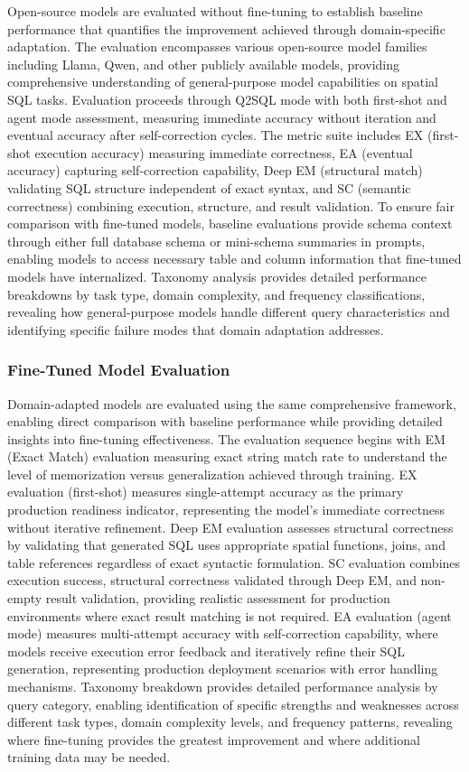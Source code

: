 Open-source models are evaluated without fine-tuning to establish baseline performance that quantifies the improvement achieved through domain-specific adaptation. The evaluation encompasses various open-source model families including Llama, Qwen, and other publicly available models, providing comprehensive understanding of general-purpose model capabilities on spatial SQL tasks. Evaluation proceeds through Q2SQL mode with both first-shot and agent mode assessment, measuring immediate accuracy without iteration and eventual accuracy after self-correction cycles. The metric suite includes EX (first-shot execution accuracy) measuring immediate correctness, EA (eventual accuracy) capturing self-correction capability, Deep EM (structural match) validating SQL structure independent of exact syntax, and SC (semantic correctness) combining execution, structure, and result validation. To ensure fair comparison with fine-tuned models, baseline evaluations provide schema context through either full database schema or mini-schema summaries in prompts, enabling models to access necessary table and column information that fine-tuned models have internalized. Taxonomy analysis provides detailed performance breakdowns by task type, domain complexity, and frequency classifications, revealing how general-purpose models handle different query characteristics and identifying specific failure modes that domain adaptation addresses.

\subsubsection{Fine-Tuned Model Evaluation}

Domain-adapted models are evaluated using the same comprehensive framework, enabling direct comparison with baseline performance while providing detailed insights into fine-tuning effectiveness. The evaluation sequence begins with EM (Exact Match) evaluation measuring exact string match rate to understand the level of memorization versus generalization achieved through training. EX evaluation (first-shot) measures single-attempt accuracy as the primary production readiness indicator, representing the model's immediate correctness without iterative refinement. Deep EM evaluation assesses structural correctness by validating that generated SQL uses appropriate spatial functions, joins, and table references regardless of exact syntactic formulation. SC evaluation combines execution success, structural correctness validated through Deep EM, and non-empty result validation, providing realistic assessment for production environments where exact result matching is not required. EA evaluation (agent mode) measures multi-attempt accuracy with self-correction capability, where models receive execution error feedback and iteratively refine their SQL generation, representing production deployment scenarios with error handling mechanisms. Taxonomy breakdown provides detailed performance analysis by query category, enabling identification of specific strengths and weaknesses across different task types, domain complexity levels, and frequency patterns, revealing where fine-tuning provides the greatest improvement and where additional training data may be needed.

